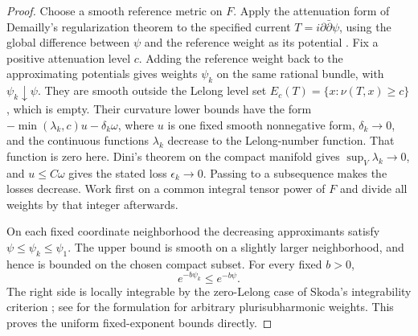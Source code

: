 \begin{proof}
Choose a smooth reference metric on $F$. Apply the attenuation form of
Demailly's regularization theorem to the specified current
$T=i\partial\bar\partial\psi$, using the global difference between
$\psi$ and the reference weight as its potential
\cite[Main Theorem~1.1]{Demailly1992}. Fix a positive attenuation
level $c$. Adding the reference weight back to the approximating
potentials gives weights $\psi_k$ on the same rational bundle, with
$\psi_k\downarrow\psi$. They are smooth outside the Lelong level set
$E_c(T)=\{x:\nu(T,x)\ge c\}$, which is empty. Their curvature lower bounds have the form
$-\min(\lambda_k,c)u-\delta_k\omega$, where $u$ is one fixed
smooth nonnegative form, $\delta_k\to0$, and the continuous functions
$\lambda_k$ decrease to the Lelong-number function. That function
is zero here. Dini's theorem on the compact manifold gives
$\sup_V\lambda_k\to0$, and $u\le C\omega$ gives the stated
loss $\epsilon_k\to0$. Passing to a subsequence makes the losses
decrease. Work first on a common integral tensor power of $F$ and
divide all weights by that integer afterwards.

On each fixed coordinate neighborhood the decreasing approximants
satisfy $\psi\le\psi_k\le\psi_1$. The upper bound is smooth on a
slightly larger neighborhood, and hence is bounded on the chosen
compact subset. For every fixed $b>0$,
\[
                      e^{-b\psi_k}\le e^{-b\psi}.
\]
The right side is locally integrable by the zero-Lelong case of Skoda's
integrability criterion \cite{Skoda1972}; see
\cite[Property~1.4(8)]{DemaillyKollar2001} for the formulation for
arbitrary plurisubharmonic weights. This proves the uniform
fixed-exponent bounds directly.
\end{proof}

